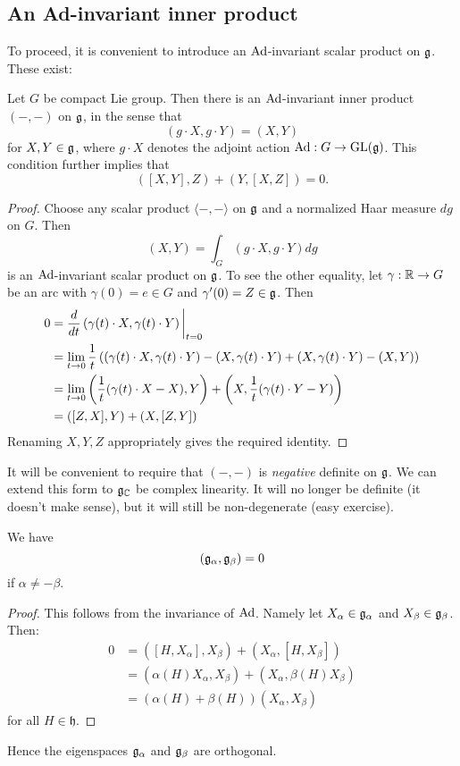 \documentclass[11pt, english]{article}
\begin{document}
\subsection{An Ad-invariant inner product}

To proceed, it is convenient to introduce an $\operatorname{Ad}$-invariant scalar product on $\mathfrak g$. These exist:

\begin{lemma}
\label{lemmainnerproduct}
Let $G$ be compact Lie group. Then there is an $\operatorname{Ad}$-invariant inner product $( -,-)$ on $\mathfrak g$, in the sense that $$( g \cdot X, g\cdot Y )  = (X , Y )$$
for $X,Y \in \mathfrak g$, where $g \cdot X$ denotes the adjoint action $\operatorname{Ad}:G \to \operatorname{GL}(\mathfrak g)$. This condition further implies that
$$
( [X,Y],Z )  +(Y,[X,Z]) = 0.
$$
\end{lemma}
\begin{proof}
 Choose any scalar product $\langle -,-\rangle $ on $\mathfrak g$ and a normalized Haar measure $dg$ on $G$. Then 
$$
(X,Y ) = \int_G (g \cdot X, g\cdot Y) dg
$$
is an $\operatorname{Ad}$-invariant scalar product on $\mathfrak g$. To see the other equality, let $\gamma:\mathbb{R} \to G$ be an arc with $\gamma(0)=e \in G$ and $\gamma'(0)=Z \in \mathfrak g$. Then
\begin{align*}
0 &=   \restr{\frac{d}{dt}\left( \gamma(t) \cdot X, \gamma(t) \cdot Y \right)}{t = 0} \\
 &= \lim_{t \to 0} \frac 1t \left(( \gamma(t) \cdot X, \gamma(t) \cdot Y ) - ( X, \gamma(t) \cdot  Y ) + ( X, \gamma(t) \cdot Y ) - ( X, Y ) \right) \\
&= \lim_{t \to 0} \left( \frac 1t (\gamma(t) \cdot X - X), Y \right) + \left( X, \frac 1t (\gamma(t) \cdot Y - Y) \right) \\
&= ( [Z,X],Y ) + ( X, [Z,Y])
\end{align*}
Renaming $X,Y,Z$ appropriately gives the required identity.
\end{proof}

It will be convenient to require that $( -,- )$ is \emph{negative} definite on $\mathfrak g$. We can extend this form to $\mathfrak g_{\mathbb{C}}$ be complex linearity. It will no longer be definite (it doesn't make sense), but it will still be non-degenerate (easy exercise). 

\begin{lemma}
We have
$$
(\mathfrak g_\alpha, \mathfrak g_\beta ) = 0
$$
if $\alpha \neq -\beta$.
\end{lemma}
\begin{proof}
This follows from the invariance of $\operatorname{Ad}$. Namely let $X_\alpha \in \mathfrak g_\alpha$ and $X_\beta \in \mathfrak g_\beta$. Then:
\begin{align*}
  0 &= ([H,X_\alpha],X_\beta ) + (X_\alpha,[H,X_\beta]) \\
&= (\alpha(H)X_\alpha, X_\beta) + (X_\alpha,\beta(H)X_\beta) \\
&= (\alpha(H)+\beta(H)) (X_\alpha,X_\beta)
\end{align*}
for all $H \in \mathfrak h$.
\end{proof}
Hence the eigenspaces $\mathfrak g_\alpha$ and $\mathfrak g_\beta$ are orthogonal.
\end{document}
